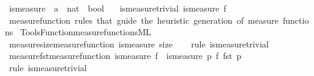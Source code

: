 \begin{isabellebody}
{}
\isamarkuptrue%
%
\endisatagdocument
{\isafolddocument}%
%
\isadelimdocument
%
\endisadelimdocument
{}\isamarkupfalse%
\ is{\isacharunderscore}{\kern0pt}measure\ {\isacharcolon}{\kern0pt}{\isacharcolon}{\kern0pt}\ {\isachardoublequoteopen}{\isacharparenleft}{\kern0pt}{\isacharprime}{\kern0pt}a\ {\isasymRightarrow}\ nat{\isacharparenright}{\kern0pt}\ {\isasymRightarrow}\ bool{\isachardoublequoteclose}\isanewline
\ \ \ is{\isacharunderscore}{\kern0pt}measure{\isacharunderscore}{\kern0pt}trivial{\isacharcolon}{\kern0pt}\ {\isachardoublequoteopen}is{\isacharunderscore}{\kern0pt}measure\ f{\isachardoublequoteclose}\isanewline
\isanewline
{}\isamarkupfalse%
\ measure{\isacharunderscore}{\kern0pt}function\ {\isachardoublequoteopen}rules\ that\ guide\ the\ heuristic\ generation\ of\ measure\ functions{\isachardoublequoteclose}\isanewline
%
\isadelimML
%
\endisadelimML
%
\isatagML
{}\isamarkupfalse%
\ {\isacartoucheopen}Tools{\isacharslash}{\kern0pt}Function{\isacharslash}{\kern0pt}measure{\isacharunderscore}{\kern0pt}functions{\isachardot}{\kern0pt}ML{\isacartoucheclose}%
\endisatagML
{\isafoldML}%
%
\isadelimML
\isanewline
%
\endisadelimML
\isanewline
{}\isamarkupfalse%
\ measure{\isacharunderscore}{\kern0pt}size{\isacharbrackleft}{\kern0pt}measure{\isacharunderscore}{\kern0pt}function{\isacharbrackright}{\kern0pt}{\isacharcolon}{\kern0pt}\ {\isachardoublequoteopen}is{\isacharunderscore}{\kern0pt}measure\ size{\isachardoublequoteclose}\isanewline
%
\isadelimproof
\ \ %
\endisadelimproof
%
\isatagproof
{}\isamarkupfalse%
\ {\isacharparenleft}{\kern0pt}rule\ is{\isacharunderscore}{\kern0pt}measure{\isacharunderscore}{\kern0pt}trivial{\isacharparenright}{\kern0pt}%
\endisatagproof
{\isafoldproof}%
%
\isadelimproof
\isanewline
%
\endisadelimproof
\isanewline
{}\isamarkupfalse%
\ measure{\isacharunderscore}{\kern0pt}fst{\isacharbrackleft}{\kern0pt}measure{\isacharunderscore}{\kern0pt}function{\isacharbrackright}{\kern0pt}{\isacharcolon}{\kern0pt}\ {\isachardoublequoteopen}is{\isacharunderscore}{\kern0pt}measure\ f\ {\isasymLongrightarrow}\ is{\isacharunderscore}{\kern0pt}measure\ {\isacharparenleft}{\kern0pt}{\isasymlambda}p{\isachardot}{\kern0pt}\ f\ {\isacharparenleft}{\kern0pt}fst\ p{\isacharparenright}{\kern0pt}{\isacharparenright}{\kern0pt}{\isachardoublequoteclose}\isanewline
%
\isadelimproof
\ \ %
\endisadelimproof
%
\isatagproof
{}\isamarkupfalse%
\ {\isacharparenleft}{\kern0pt}rule\ is{\isacharunderscore}{\kern0pt}measure{\isacharunderscore}{\kern0pt}trivial{\isacharparenright}{\kern0pt}%

\end{isabellebody}
